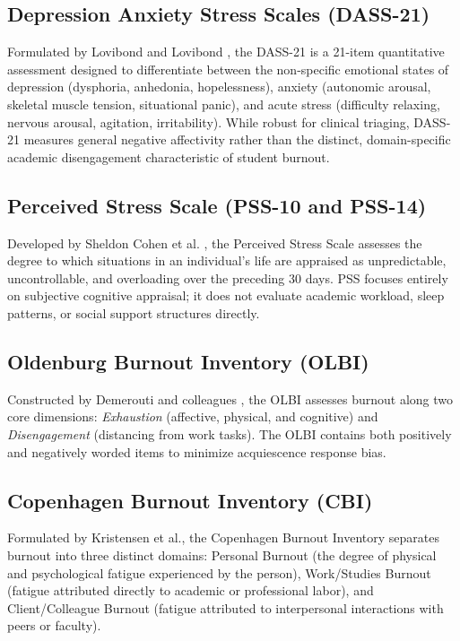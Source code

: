 \documentclass[12pt,a4paper,oneside]{report}
\begin{document}
\subsection{Depression Anxiety Stress Scales (DASS-21)}
Formulated by Lovibond and Lovibond \cite{lovibond1995}, the DASS-21 is a 21-item quantitative assessment designed to differentiate between the non-specific emotional states of depression (dysphoria, anhedonia, hopelessness), anxiety (autonomic arousal, skeletal muscle tension, situational panic), and acute stress (difficulty relaxing, nervous arousal, agitation, irritability). While robust for clinical triaging, DASS-21 measures general negative affectivity rather than the distinct, domain-specific academic disengagement characteristic of student burnout.

\subsection{Perceived Stress Scale (PSS-10 and PSS-14)}
Developed by Sheldon Cohen et al. \cite{cohen1983}, the Perceived Stress Scale assesses the degree to which situations in an individual's life are appraised as unpredictable, uncontrollable, and overloading over the preceding 30 days. PSS focuses entirely on subjective cognitive appraisal; it does not evaluate academic workload, sleep patterns, or social support structures directly.

\subsection{Oldenburg Burnout Inventory (OLBI)}
Constructed by Demerouti and colleagues \cite{demerouti2001}, the OLBI assesses burnout along two core dimensions: \emph{Exhaustion} (affective, physical, and cognitive) and \emph{Disengagement} (distancing from work tasks). The OLBI contains both positively and negatively worded items to minimize acquiescence response bias.

\subsection{Copenhagen Burnout Inventory (CBI)}
Formulated by Kristensen et al., the Copenhagen Burnout Inventory separates burnout into three distinct domains: Personal Burnout (the degree of physical and psychological fatigue experienced by the person), Work/Studies Burnout (fatigue attributed directly to academic or professional labor), and Client/Colleague Burnout (fatigue attributed to interpersonal interactions with peers or faculty).
\end{document}
